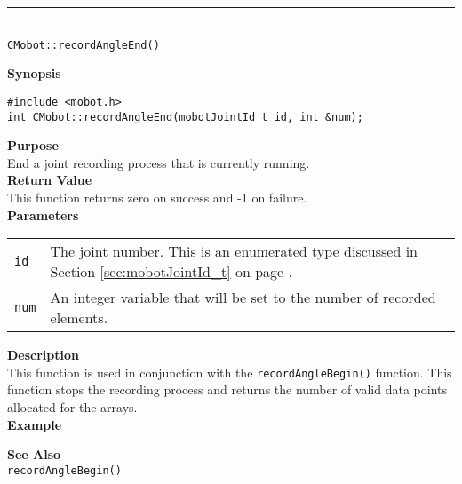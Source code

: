 \noindent
\vspace{5pt}
\rule{4.5in}{0.015in}\\
\noindent
{\LARGE \texttt{CMobot::recordAngleEnd()}}\\
{}

\noindent
{\bf Synopsis}
\vspace{-8pt}
\begin{verbatim}
#include <mobot.h>
int CMobot::recordAngleEnd(mobotJointId_t id, int &num);
\end{verbatim}

\noindent
{\bf Purpose}\\
End a joint recording process that is currently running.\\

\noindent
{\bf Return Value}\\
This function returns zero on success and -1 on failure.\\

\noindent
{\bf Parameters}\\
\vspace{-0.1in}
\begin{description}
\item               
\begin{tabular}{p{15 mm}p{145 mm}}
\texttt{id} & The joint number. This is an enumerated type 
discussed in Section \ref{sec:mobotJointId_t} on page
\pageref{sec:mobotJointId_t}.\\
\texttt{num} & An integer variable that will be set to the number of recorded elements. \\
\end{tabular}
\end{description}

\noindent
{\bf Description}\\
This function is used in conjunction with the \texttt{recordAngleBegin()} function. 
This function stops the recording process and returns the number of valid data points
allocated for the arrays.\\

\noindent
{\bf Example}\\
\noindent

\noindent
{\bf See Also}\\
\texttt{recordAngleBegin()} \\
